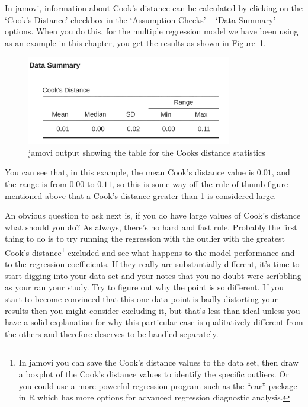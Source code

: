 \documentclass[
  a4paper,
]{book}
\begin{document}
In jamovi, information about Cook's distance can be calculated by
clicking on the `Cook's Distance' checkbox in the `Assumption Checks' --
`Data Summary' options. When you do this, for the multiple regression
model we have been using as an example in this chapter, you get the
results as shown in Figure~\ref{fig-fig12-27}.

\begin{figure}[H]

\includegraphics[width=0.8\textwidth,height=\textheight]{images/fig12-27.png} \hfill{}

\caption{\label{fig-fig12-27}jamovi output showing the table for the
Cooks distance statistics}

\end{figure}

You can see that, in this example, the mean Cook's distance value is
\(0.01\), and the range is from \(0.00\) to \(0.11\), so this is some
way off the rule of thumb figure mentioned above that a Cook's distance
greater than 1 is considered large.

An obvious question to ask next is, if you do have large values of
Cook's distance what should you do? As always, there's no hard and fast
rule. Probably the first thing to do is to try running the regression
with the outlier with the greatest Cook's distance\footnote{In jamovi
  you can save the Cook's distance values to the data set, then draw a
  boxplot of the Cook's distance values to identify the specific
  outliers. Or you could use a more powerful regression program such as
  the ``car'' package in R which has more options for advanced
  regression diagnostic analysis.} excluded and see what happens to the
model performance and to the regression coefficients. If they really are
substantially different, it's time to start digging into your data set
and your notes that you no doubt were scribbling as your ran your study.
Try to figure out why the point is so different. If you start to become
convinced that this one data point is badly distorting your results then
you might consider excluding it, but that's less than ideal unless you
have a solid explanation for why this particular case is qualitatively
different from the others and therefore deserves to be handled
separately.
\end{document}
